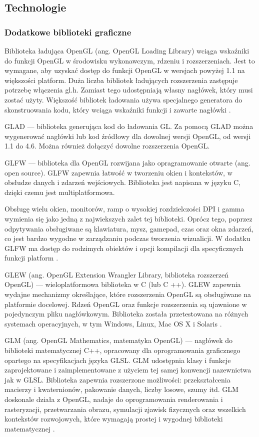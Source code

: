 \newpage
\subsection{Technologie}
\subsubsection{Dodatkowe biblioteki graficzne}
Biblioteka ładująca OpenGL (ang. OpenGL Loading Library) wciąga wskaźniki do funkcji OpenGL w środowisku wykonawczym, rdzeniu i rozszerzeniach. Jest to wymagane, aby uzyskać dostęp do funkcji OpenGL w wersjach powyżej 1.1 na większości platform. Duża liczba bibliotek ładujących rozszerzenia zastępuje potrzebę włączenia gl.h. Zamiast tego udostępniają własny nagłówek, który musi zostać użyty. Większość bibliotek ładowania używa specjalnego generatora do skonstruowania kodu, który wciąga wskaźniki funkcji i zawarte nagłówki \cite{LoadingLibrary}. 

GLAD --- biblioteka generująca kod do ładowania GL. Za pomocą GLAD można wygenerować nagłówki lub kod źródłowy dla dowolnej wersji OpenGL, od wersji 1.1 do 4.6. Można również dołączyć dowolne rozszerzenia OpenGL.

GLFW --- biblioteka dla OpenGL rozwijana jako opragramowanie otwarte (ang. open source). GLFW zapewnia łatwość w tworzeniu okien i kontekstów, w obsłudze danych i zdarzeń wejściowych. Biblioteka jest napisana w języku C, dzięki czemu jest multiplatformowa.  

Obsługę wielu okien, monitorów, ramp o wysokiej rozdzielczości DPI i gamma wymienia się jako jedną z najwiekszych zalet tej biblioteki. Oprócz tego, poprzez odpytywania obsługiwane są klawiatura, mysz, gamepad, czas oraz okna zdarzeń, co jest bardzo wygodne w zarządzaniu podczas tworzenia wizualicji. W dodatku GLFW ma dostęp do rodzimych obiektów i opcji kompilacji dla specyficznych funkcji platform \cite{glfw}.

GLEW (ang. OpenGL Extension Wrangler Library, biblioteka rozszerzeń OpenGL) --- wieloplatformowa biblioteka w C (lub C ++). GLEW zapewnia wydajne mechanizmy określające, które rozszerzenia OpenGL są obsługiwane na platformie docelowej. Rdzeń OpenGL oraz funkcje rozszerzenia są ujawnione w pojedynczym pliku nagłówkowym. Biblioteka została przetestowana na różnych systemach operacyjnych, w tym Windows, Linux, Mac OS X i Solaris \cite{glew}.

GLM (ang. OpenGL Mathematics, matematyka OpenGL) --- nagłówek do biblioteki matematycznej C++, opracowany dla oprogramowania graficznego opartego na specyfikacjach języka GLSL. GLM udostępnia klasy i funkcje zaprojektowane i zaimplementowane z użyciem tej samej konwencji nazewnictwa jak w GLSL. Biblioteka zapewnia rozszerzone możliwości: przekształcenia macierzy i kwaternionów, pakowanie danych, liczby losowe, szumy itd. GLM doskonale działa z OpenGL, nadaje do oprogramowania renderowania i rasteryzacji, przetwarzania obrazu, symulacji zjawisk fizycznych oraz wszelkich kontekstów rozwojowych, które wymagają prostej i wygodnej biblioteki matematycznej \cite{glm}. 

